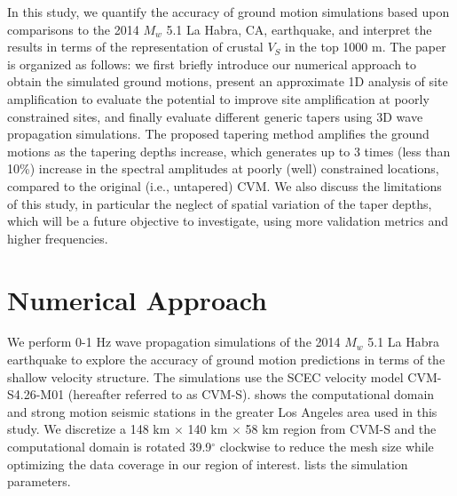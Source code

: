 In this study, we quantify the accuracy of ground motion simulations based upon comparisons to the 2014 $M_w$ 5.1 La Habra, CA, earthquake, and interpret the results in terms of the representation of crustal $V_S$ in the top 1000 m. The paper is organized as follows: we first briefly introduce our numerical approach to obtain the simulated ground motions, present an approximate 1D analysis of site amplification to evaluate the potential to improve site amplification at poorly constrained sites, and finally evaluate different generic tapers using 3D wave propagation simulations. The proposed tapering method amplifies the ground motions as the tapering depths increase, which generates up to 3 times (less than 10\%) increase in the spectral amplitudes at poorly (well) constrained locations, compared to the original (i.e., untapered) CVM. We also discuss the limitations of this study, in particular the neglect of spatial variation of the taper depths, which will be a future objective to investigate, using more validation metrics and higher frequencies.



\section{Numerical Approach}\label{vs30:approach}
We perform 0-1 Hz wave propagation simulations of the 2014 $M_w$ 5.1 La Habra earthquake to explore the accuracy of ground motion predictions in terms of the shallow velocity structure. The simulations use the SCEC velocity model CVM-S4.26-M01 (hereafter referred to as CVM-S).  shows the computational domain and strong motion seismic stations in the greater Los Angeles area used in this study. We discretize a 148 km $\times$ 140 km $\times$ 58 km region from CVM-S and the computational domain is rotated 39.9$^\circ$ clockwise to reduce the mesh size while optimizing the data coverage in our region of interest.  lists the simulation parameters.

